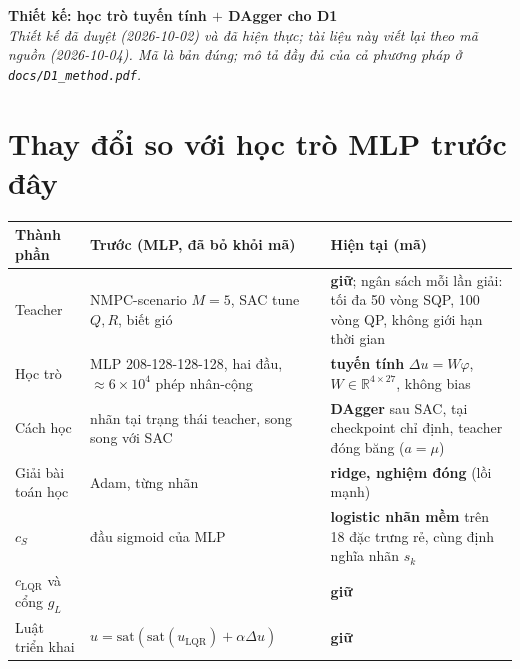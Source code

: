 \documentclass[11pt]{article}
\newcommand{\R}{\mathbb{R}}
\newcommand{\cS}{c_{S}}
\newcommand{\cL}{c_{\mathrm{LQR}}}
\newcommand{\uL}{u_{\mathrm{LQR}}}
\begin{document}
{\color{navy}\LARGE\bfseries Thiết kế: học trò tuyến tính $+$ DAgger cho D1}\\[1mm]
{\itshape Thiết kế đã duyệt (2026-10-02) và đã hiện thực; tài liệu này viết lại theo mã nguồn (2026-10-04). Mã là bản đúng;
mô tả đầy đủ của cả phương pháp ở \texttt{docs/D1\_method.pdf}.}\\[1mm]

\section{Thay đổi so với học trò MLP trước đây}
\begin{center}\small
\begin{tabular}{@{}p{3.6cm}p{5.4cm}p{6.2cm}@{}}
\toprule
\textbf{Thành phần} & \textbf{Trước (MLP, đã bỏ khỏi mã)} & \textbf{Hiện tại (mã)}\\
\midrule
Teacher & NMPC-scenario $M{=}5$, SAC tune $Q,R$, biết gió & \textbf{giữ}; ngân sách mỗi lần giải: tối đa 50 vòng SQP, 100 vòng QP, không giới hạn thời gian\\
Học trò & MLP 208-128-128-128, hai đầu, $\approx6\times10^4$ phép nhân-cộng & \textbf{tuyến tính} $\Delta u=W\varphi$, $W\in\R^{4\times27}$, không bias\\
Cách học & nhãn tại trạng thái teacher, song song với SAC & \textbf{DAgger} sau SAC, tại checkpoint chỉ định, teacher đóng băng ($a=\mu$)\\
Giải bài toán học & Adam, từng nhãn & \textbf{ridge, nghiệm đóng} (lồi mạnh)\\
$\cS$ & đầu sigmoid của MLP & \textbf{logistic nhãn mềm} trên 18 đặc trưng rẻ, cùng định nghĩa nhãn $s_k$\\
$\cL$ và cổng $g_L$ & & \textbf{giữ}\\
Luật triển khai & $u=\mathrm{sat}(\mathrm{sat}(\uL)+\alpha\Delta u)$ & \textbf{giữ}\\
\bottomrule
\end{tabular}
\end{center}
\end{document}
